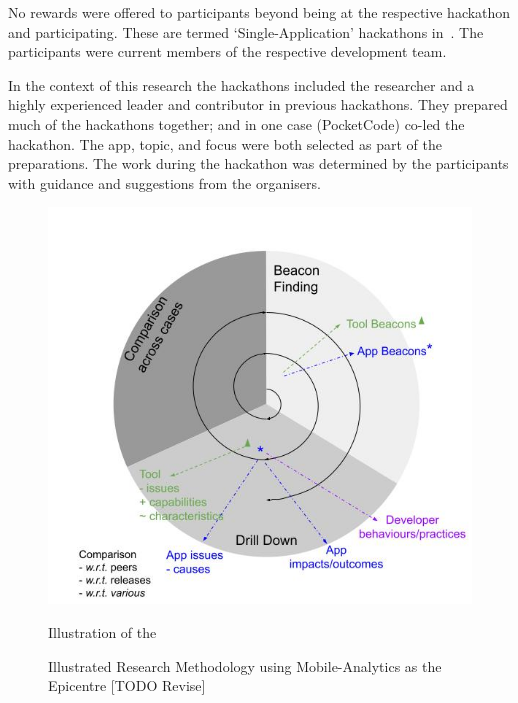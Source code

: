 No rewards were offered to participants beyond being at the respective hackathon and participating. These are termed `Single-Application' hackathons in~\citealt[p.5]{briscoe2014_digital_innovation_the_hackathon_phenomenon}. The participants were current members of the respective development team.

In the context of this research the hackathons included the researcher and a highly experienced leader and contributor in previous hackathons. They prepared much of the hackathons together; and in one case (PocketCode) co-led the hackathon. The app, topic, and focus were both selected as part of the preparations. The work during the hackathon was determined by the participants with guidance and suggestions from the organisers.



\begin{figure}
    \centering
    \includegraphics[width=14cm]{images/my/Illustrated-Research-Methodology-using-Mobile-Analytics-as-the-Epicentre-v0-2.jpeg}
    \caption{Illustrated Research Methodology using Mobile-Analytics as the Epicentre [TODO Revise]}
    Illustration of the 
    \label{fig:Illustrated-Research-Methodology-using-Mobile-Analytics-as-the-Epicentre}
\end{figure}

\dotfill 

